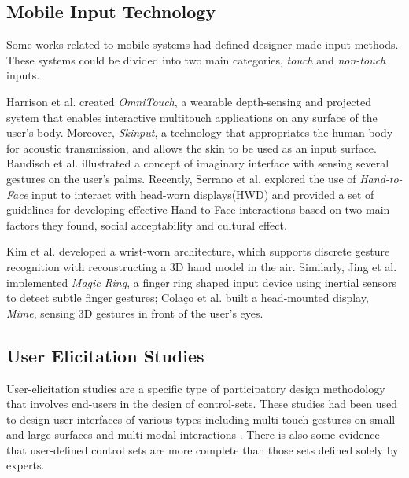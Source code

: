 \documentclass{sigchi}
\begin{document}
    \subsection{Mobile Input Technology}
    Some works related to mobile systems had defined designer-made input methods. These systems could be divided into two main categories, \emph{touch} and \emph{non-touch} inputs. 

    Harrison et al.\cite{Harrison:2011:OWM:2047196.2047255} created \textsl{OmniTouch}, a wearable depth-sensing and projected system that enables interactive multitouch applications on any surface of the user's body. Moreover, \textsl{Skinput}\cite{Harrison:2010:SAB:1753326.1753394}, a technology that appropriates the human body for acoustic transmission, and allows the skin to be used as an input surface. Baudisch et al.\cite{Gustafson:2011:IPL:2047196.2047233} illustrated a concept of imaginary interface with sensing several gestures on the user's palms. Recently, Serrano et al.\cite{Serrano:2014:EUH:2611247.2556984} explored the use of \textsl{Hand-to-Face} input to interact with head-worn displays(HWD) and provided a set of guidelines for developing effective Hand-to-Face interactions based on two main factors they found, social acceptability and cultural effect.

    Kim et al.\cite{Kim:2012:DFI:2380116.2380139} developed a wrist-worn architecture, which supports discrete gesture recognition with reconstructing a 3D hand model in the air. Similarly, Jing et al.\cite{Jing:2013:MRS:2541831.2541875} implemented \textsl{Magic Ring}, a finger ring shaped input device using inertial sensors to detect subtle finger gestures; Cola\c{c}o et al.\cite{Colaco:2013:MCL:2501988.2502042} built a head-mounted display, \textsl{Mime}, sensing 3D gestures in front of the user's eyes. 

    \subsection{User Elicitation Studies}
    User-elicitation studies are a specific type of participatory design methodology that involves end-users in the design of control-sets\cite{Good:1984:BUI:358274.358284,Morris:2012:WWI:2396636.2396651}. These studies had been used to design user interfaces of various types including multi-touch gestures on small and large surfaces\cite{Anthony:2012:IRC:2396636.2396671,Epps:2006:SHS:1125451.1125601,Wobbrock:2009:UGS:1518701.1518866,Findlater:2012:BQA:2207676.2208660} and multi-modal interactions \cite{Morris:2012:WWI:2396636.2396651,Valdes:2014:EDS:2611222.2557373}. There is also some evidence that user-defined control sets are more complete than those sets defined solely by experts\cite{Anthony:2012:IRC:2396636.2396671,Pyryeskin:2012:CEG:2396636.2396638,Wobbrock:2009:UGS:1518701.1518866}.
\end{document}

